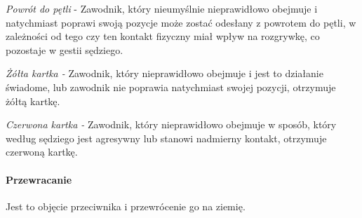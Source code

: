 \documentclass[12pt]{article}
\begin{document}
\emph{Powrót do pętli} - Zawodnik, który nieumyślnie nieprawidłowo
obejmuje i natychmiast poprawi swoją pozycje może zostać odesłany z
powrotem do pętli, w zależności od tego czy ten kontakt fizyczny miał
wpływ na rozgrywkę, co pozostaje w gestii sędziego.

\emph{Żółta kartka -} Zawodnik, który nieprawidłowo obejmuje i jest to
działanie świadome, lub zawodnik nie poprawia natychmiast swojej
pozycji, otrzymuje żółtą kartkę.

\emph{Czerwona kartka -} Zawodnik, który nieprawidłowo obejmuje w
sposób, który według sędziego jest agresywny lub stanowi nadmierny
kontakt, otrzymuje czerwoną kartkę.

\paragraph{Przewracanie}
Jest to objęcie przeciwnika i
przewrócenie go na ziemię.
\end{document}
